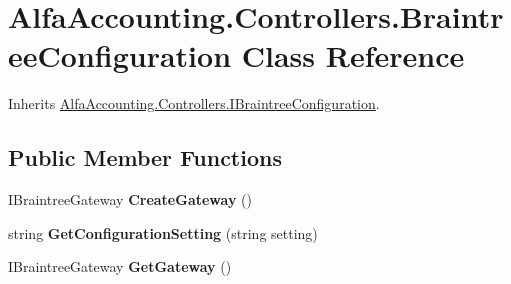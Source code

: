 \hypertarget{class_alfa_accounting_1_1_controllers_1_1_braintree_configuration}{}\section{Alfa\+Accounting.\+Controllers.\+Braintree\+Configuration Class Reference}
\label{class_alfa_accounting_1_1_controllers_1_1_braintree_configuration}


Inherits \hyperlink{interface_alfa_accounting_1_1_controllers_1_1_i_braintree_configuration}{Alfa\+Accounting.\+Controllers.\+I\+Braintree\+Configuration}.

\subsection*{Public Member Functions}
\begin{DoxyCompactItemize}
\item 
\mbox{\label{class_alfa_accounting_1_1_controllers_1_1_braintree_configuration_a8213f88efb1cdc3f40f72c00832db555}} 
I\+Braintree\+Gateway {\bfseries Create\+Gateway} ()
\item 
\mbox{\label{class_alfa_accounting_1_1_controllers_1_1_braintree_configuration_a3e572d8f9e5e5da9d878fc33525359a9}} 
string {\bfseries Get\+Configuration\+Setting} (string setting)
\item 
\mbox{\label{class_alfa_accounting_1_1_controllers_1_1_braintree_configuration_a16ffe65e709f7fb1ec7059ed2c22118a}} 
I\+Braintree\+Gateway {\bfseries Get\+Gateway} ()
\end{DoxyCompactItemize}
